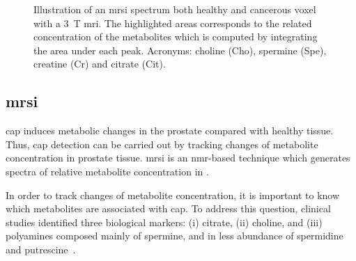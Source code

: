 \begin{figure}
	\centering
	\hspace*{\fill}
	 \hfill
	\hspace*{\fill}
	\caption[Illustration of healthy and cancerous \acs*{mrsi} spectrum.]{Illustration of an \acs*{mrsi} spectrum both healthy and cancerous voxel with a \SI{3}{\tesla} \acs*{mri}. The highlighted areas corresponds to the related concentration of the metabolites which is computed by integrating the area under each peak. Acronyms: choline (Cho), spermine (Spe), creatine (Cr) and citrate (Cit).}
	\label{fig:mrsi}
\end{figure}


\subsection{\acs*{mrsi}}\label{subsec:chp2:imaging:mrsi}
\ac{cap} induces metabolic changes in the prostate compared with healthy tissue.
Thus, \ac{cap} detection can be carried out by tracking changes of metabolite concentration in prostate tissue.
\ac{mrsi} is an \ac{nmr}-based technique which generates spectra of relative metabolite concentration in .

In order to track changes of metabolite concentration, it is important to know which metabolites are associated with \ac{cap}.
To address this question, clinical studies identified three biological markers: (i) citrate, (ii) choline, and (iii) polyamines composed mainly of spermine, and in less abundance of spermidine and putrescine~\cite{Awwad2012,Costello2006,Giskeodegard2013}. 

